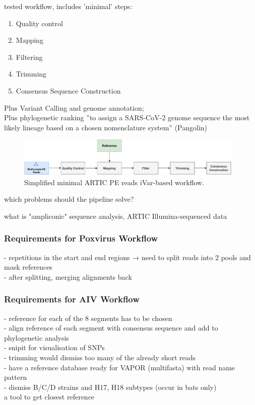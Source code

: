 tested workflow, includes 'minimal' steps:
\begin{enumerate}
	\item Quality control
	\item Mapping
	\item Filtering
	\item Trimming
	\item Consensus Sequence Construction
\end{enumerate}

Plus Variant Calling and genome annotation; \\
Plus phylogenetic ranking ''to assign a SARS-CoV-2 genome sequence the most likely lineage based on a chosen nomenclature system'' (Pangolin)

\begin{figure}[H]
	\centering
	\includegraphics[width=0.97\textwidth]{media/3-pipelines-minimal.pdf}
	\caption{Simplified minimal ARTIC PE reads iVar-based workflow.}
	\label{fig:3-pipelines-minimal}
\end{figure}


which problems should the pipeline solve?

what is "ampliconic" sequence analysis, ARTIC Illumina-sequenced data

\subsubsection{Requirements for Poxvirus Workflow}
- repetitions in the start and end regions → need to split reads into 2 pools and mask references \\
- after splitting, merging alignments back

\subsubsection{Requirements for AIV Workflow}
- reference for each of the 8 segments has to be chosen \\
- align reference of each segment with consensus sequence and add to phylogenetic analysis \\
- snipit for visualisation of SNPs \\
- trimming would dismiss too many of the already short reads \\
- have a reference database ready for VAPOR (multifasta) with read name pattern \\
- dismiss B/C/D strains and H17, H18 subtypes (occur in bats only)
\\ a tool to get closest reference

